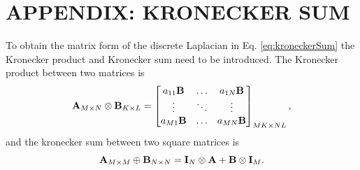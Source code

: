 \documentclass[fleqn]{jaes}
\begin{document}
\section*{APPENDIX: KRONECKER SUM}\label{app:kronecker}
To obtain the matrix form of the discrete Laplacian in Eq. \eqref{eq:kroneckerSum} the Kronecker product and Kronecker sum need to be introduced. The Kronecker product between two matrices is \cite{Horn1991}
\begin{equation}
    \mathbf{A}_{M\times N} \otimes \mathbf{B}_{K\times L} = \begin{bmatrix}
        a_{11}\mathbf{B} & \hdots & a_{1N}\mathbf{B}\\
        \vdots & \ddots & \vdots\\
        a_{M1}\mathbf{B} & \hdots & a_{MN}\mathbf{B}\\
    \end{bmatrix}_{MK \times NL},
\end{equation}
and the kronecker sum between two square matrices is \cite{Hamilton2016}
\begin{equation}\label{eq:kronSum}
    \A_{M \times M} \oplus \B_{N \times N} = \I_N\otimes \A + \B \otimes\I_M.
\end{equation}
\end{document}
